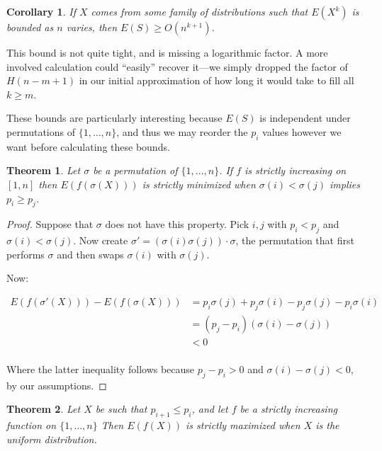 \documentclass[a4paper]{book}
\newtheorem{corollary}{Corollary}[section]
\newtheorem{theorem}{Theorem}[section]
\begin{document}
\begin{corollary}
If \(X\) comes from some family of distributions such that \(E(X^k)\) is bounded as \(n\) varies,
then \(E(S) \geq O(n^{k + 1})\).
\end{corollary}

This bound is not quite tight,
and is missing a logarithmic factor.
A more involved calculation could ``easily'' recover it---we
simply dropped the factor of \(H(n - m + 1)\) in our initial approximation of how long it would take to fill all \(k \geq m\).

These bounds are particularly interesting because \(E(S)\) is independent under permutations of \(\{1, \ldots, n\}\),
and thus we may reorder the \(p_i\) values however we want before calculating these bounds.

\begin{theorem}
Let \(\sigma\) be a permutation of \(\{1, \ldots, n\}\).
If \(f\) is strictly increasing on \([1, n]\) then \(E(f(\sigma(X)))\) is strictly minimized when \(\sigma(i) < \sigma(j)\) implies \(p_i \geq p_j\).
\end{theorem}

\begin{proof}
Suppose that \(\sigma\) does not have this property.
Pick \(i, j\) with \(p_i < p_j\) and \(\sigma(i) < \sigma(j)\).
Now create \(\sigma' = (\sigma(i) \sigma(j)) \cdot \sigma\),
the permutation that first performs \(\sigma\) and then swaps \(\sigma(i)\) with \(\sigma(j)\).

Now:

\begin{align*}
E(f(\sigma'(X))) - E(f(\sigma(X))) &= p_i \sigma(j) + p_j \sigma(i) -  p_j \sigma(j) - p_i \sigma(i) \\
&= (p_j - p_i) (\sigma(i) - \sigma(j)) \\
&< 0\\ 
\end{align*}

Where the latter inequality follows because \(p_j - p_i > 0\) and \(\sigma(i) - \sigma(j) < 0\),
by our assumptions.
\end{proof}

\begin{theorem}
Let \(X\) be such that \(p_{i + 1} \leq p_i\),
and let \(f\) be a strictly increasing function on \(\{1, \ldots, n\}\)
Then \(E(f(X))\) is strictly maximized when \(X\) is the uniform distribution.
\end{theorem}
\end{document}
